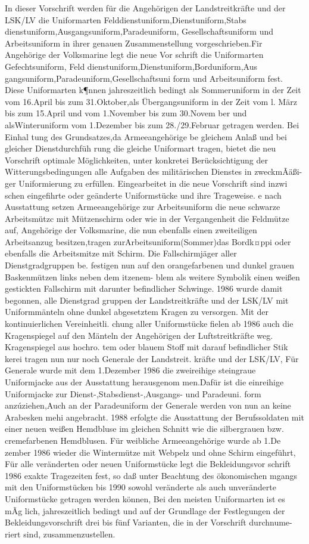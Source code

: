 

In dieser Vorschrift werden für die Angehörigen
der Landstreitkräfte und der LSK/LV die Uniformarten Felddienstuniform,Dienstuniform,Stabs
dienstuniform,Ausgangsuniform,Paradeuniform,
Gesellschaftsuniform und Arbeitsuniform in ihrer
genauen Zusammenstellung vorgeschrieben.Fir
Angehörige der Volksmarine legt die neue Vor
schrift die Uniformarten Gefechtsuniform, Feld
dienstuniform,Dienstuniform,Borduniform,Aus
gangsuniform,Paradeuniform,Gesellschaftsuni
form und Arbeitsuniform fest. Diese Uniformarten
k¶nnen jahreszeitlich bedingt als Sommeruniform
in der Zeit vom 16.April bis zum 31.Oktober,als
Übergangsuniform in der Zeit vom l. März bis zum
15.April und vom 1.November bis zum 30.Novem
ber und alsWinteruniform vom 1.Dezember bis
zum 28./29.Februar getragen werden. Bei Einhal
tung des Grundsatzes,da Armeeangehörige be
gleichem Anlaß und bei gleicher Dienstdurchfüh
rung die gleiche Uniformart tragen, bietet die neu
Vorschrift optimale Möglichkeiten, unter konkretei
Berücksichtigung der Witterungsbedingungen alle
Aufgaben des militärischen Dienstes in zweckmÃäßi-
ger Uniformierung zu erfüllen.
Eingearbeitet in die neue Vorschrift sind inzwi
schen eingefihrte oder geänderte Uniformstücke
und ihre Trageweise.
e nach Ausstattung setzen Armeeangehörige zur
Arbeitsuniform die neue schwarze Arbeitsmützc
mit Mützenschirm oder wie in der Vergangenheit
die Feldmütze auf, Angehörige der Volksmarine,
die nun ebenfalls einen zweiteiligen Arbeitsanzug
besitzen,tragen zurArbeitsuniform(Sommer)das
Bordk¤ppi oder ebenfalls die Arbeitsmitze mit
Schirm.
Die Fallschirmjäger aller Dienstgradgruppen be.
festigen nun auf den orangefarbenen und dunkel
grauen Baskenmützen links neben dem itzenem-
blem als weitere Symbolik einen weißen gestickten
Fallschirm mit darunter befindlicher Schwinge.
1986 wurde damit begonnen, alle Dienstgrad
gruppen der Landstreitkräfte und der LSK/LV mit Uniformmänteln ohne dunkel abgesetztem Kragen
zu versorgen. Mit der kontinuierlichen Vereinheitli.
chung aller Uniformstücke fielen ab 1986 auch die
Kragenspiegel auf den Mänteln der Angehörigen
der Luftstreitkräfte weg. Kragenspiegel aus hochro.
tem oder blauem Stoff mit darauf befindlicher Stik
kerei tragen nun nur noch Generale der Landstreit.
kräfte und der LSK/LV, Für Generale wurde mit
dem 1.Dezember 1986 die zweireihige steingraue
Uniformjacke aus der Ausstattung herausgenom
men.Dafür ist die einreihige Uniformjacke zur
Dienst-,Stabsdienst-,Ausgangs- und Paradeuni.
form anzúziehen,Auch an der Paradeuniform der
Generale werden von nun an keine Arabesken mehi
angebracht.
1988 erfolgte die Ausstattung der Berufssoldaten
mit einer neuen weißen Hemdbluse im gleichen
Schnitt wie die silbergrauen bzw. cremefarbenen
Hemdblusen.
Für weibliche Armeeangehörige wurde ab 1.De
zember 1986 wieder die Wintermütze mit Webpelz
und ohne Schirm eingeführt, Für alle veränderten
oder neuen Uniformstücke legt die Bekleidungsvor
schrift 1986 exakte Tragezeiten fest, so daß unter
Beachtung des ökonomischen mgangs mit den
Uniformstücken bis 1990 sowohl veränderte als
auch unveränderte Uniformstücke getragen werden
können, Bei den meisten Uniformarten ist es mÃg
lich, jahreszeitlich bedingt und auf der Grundlage
der Festlegungen der Bekleidungsvorschrift drei bis
fünf Varianten, die in der Vorschrift durchnume-
riert sind, zusammenzustellen.